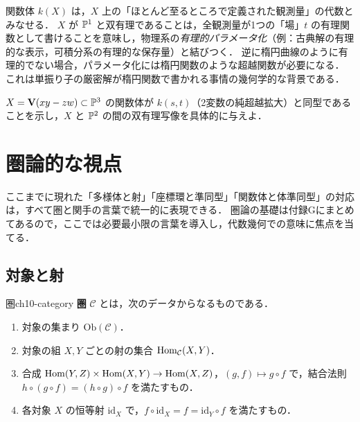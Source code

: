 \begin{physbox}
関数体 $k(X)$ は，$X$ 上の「ほとんど至るところで定義された観測量」の代数とみなせる．
$X$ が $\mathbb{P}^1$ と双有理であることは，全観測量が1つの「場」$t$ の有理関数として書けることを意味し，物理系の\emph{有理的パラメータ化}（例：古典解の有理的な表示，可積分系の有理的な保存量）と結びつく．
逆に楕円曲線のように有理的でない場合，パラメータ化には楕円関数のような超越関数が必要になる．
これは単振り子の厳密解が楕円関数で書かれる事情の幾何学的な背景である．
\end{physbox}

$X=\mathbf{V}(xy-zw)\subset\mathbb{P}^3$ の関数体が $k(s,t)$（2変数の純超越拡大）と同型であることを示し，$X$ と $\mathbb{P}^2$ の間の双有理写像を具体的に与えよ．

\section{圏論的な視点}

ここまでに現れた「多様体と射」「座標環と準同型」「関数体と体準同型」の対応は，すべて圏と関手の言葉で統一的に表現できる．
圏論の基礎は付録Gにまとめてあるので，ここでは必要最小限の言葉を導入し，代数幾何での意味に焦点を当てる．

\subsection{対象と射}

\begin{mydef}{圏}{ch10-category}
\textbf{圏} $\mathcal C$ とは，次のデータからなるものである．
\begin{enumerate}
  \item 対象の集まり $\mathrm{Ob}(\mathcal C)$．
  \item 対象の組 $X,Y$ ごとの射の集合 $\operatorname{Hom}_{\mathcal C}(X,Y)$．
  \item 合成 $\operatorname{Hom}(Y,Z)\times\operatorname{Hom}(X,Y)\to\operatorname{Hom}(X,Z)$，$(g,f)\mapsto g\circ f$ で，結合法則 $h\circ(g\circ f)=(h\circ g)\circ f$ を満たすもの．
  \item 各対象 $X$ の恒等射 $\mathrm{id}_X$ で，$f\circ\mathrm{id}_X=f=\mathrm{id}_Y\circ f$ を満たすもの．
\end{enumerate}
\end{mydef}

